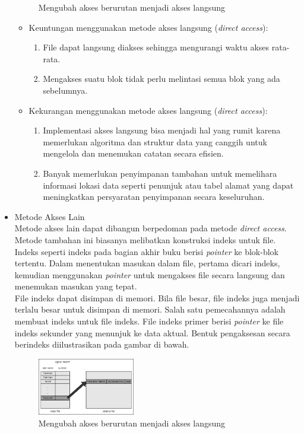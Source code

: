 \documentclass[12pt]{article}
\begin{document}
\begin{itemize}
\begin{figure}[h]
            \caption{Mengubah akses berurutan menjadi akses langsung}
        \end{figure}
        \begin{itemize}
            \item Keuntungan menggunakan metode akses langsung (\textit{direct access}):
            \begin{enumerate}
                \item File dapat langsung diakses sehingga mengurangi waktu akses rata-rata.
                \item Mengakses suatu blok tidak perlu melintasi semua blok yang ada sebelumnya.
            \end{enumerate}
            \item Kekurangan menggunakan metode akses langsung (\textit{direct access}):
            \begin{enumerate}
                \item Implementasi akses langsung bisa menjadi hal yang rumit karena memerlukan algoritma dan struktur data yang canggih untuk mengelola dan menemukan catatan secara efisien.
                \item Banyak memerlukan penyimpanan tambahan untuk memelihara informasi lokasi data seperti penunjuk atau tabel alamat yang dapat meningkatkan persyaratan penyimpanan secara keseluruhan.
            \end{enumerate}
        \end{itemize}
    \item  Metode Akses Lain
        \\Metode akses lain dapat dibangun berpedoman pada metode \textit{direct access}. Metode tambahan ini biasanya melibatkan konstruksi indeks untuk file. Indeks seperti indeks pada bagian akhir buku berisi \textit{pointer} ke blok-blok tertentu. Dalam menentukan masukan dalam file, pertama dicari indeks, kemudian menggunakan \textit{pointer} untuk mengakses file secara langsung dan menemukan masukan yang tepat.
        \\File indeks dapat disimpan di memori. Bila file besar, file indeks juga menjadi terlalu besar untuk disimpan di memori. Salah satu pemecahannya adalah membuat indeks untuk file indeks. File indeks primer berisi \textit{pointer} ke file indeks sekunder yang menunjuk ke data aktual. Bentuk pengaksesan secara berindeks diilustrasikan pada gambar di bawah.
        \begin{figure}[h]
			\centering
			\includegraphics[width=0.4\textwidth]{asset/gambar5.png}
            \caption{Mengubah akses berurutan menjadi akses langsung}
        \end{figure}
    \end{itemize}
\end{document}
